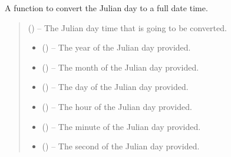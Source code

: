 \documentclass[letterpaper,11pt,english]{sphinxmanual}
\begin{document}

\begin{savenotes}\begin{fulllineitems}
\label{\detokenize{code/opihiexarata.library.conversion:opihiexarata.library.conversion.julian_day_to_full_date}}
\pysigstartsignatures
{}
\pysigstopsignatures
\sphinxAtStartPar
A function to convert the Julian day to a full date time.
\begin{quote}\begin{description}
\sphinxAtStartPar
{} () – The Julian day time that is going to be converted.

\sphinxAtStartPar
\begin{itemize}
\item {} 
\sphinxAtStartPar
{} () – The year of the Julian day provided.

\item {} 
\sphinxAtStartPar
{} () – The month of the Julian day provided.

\item {} 
\sphinxAtStartPar
{} () – The day of the Julian day provided.

\item {} 
\sphinxAtStartPar
{} () – The hour of the Julian day provided.

\item {} 
\sphinxAtStartPar
{} () – The minute of the Julian day provided.

\item {} 
\sphinxAtStartPar
{} () – The second of the Julian day provided.

\end{itemize}


\end{description}\end{quote}

\end{fulllineitems}\end{savenotes}
\end{document}
